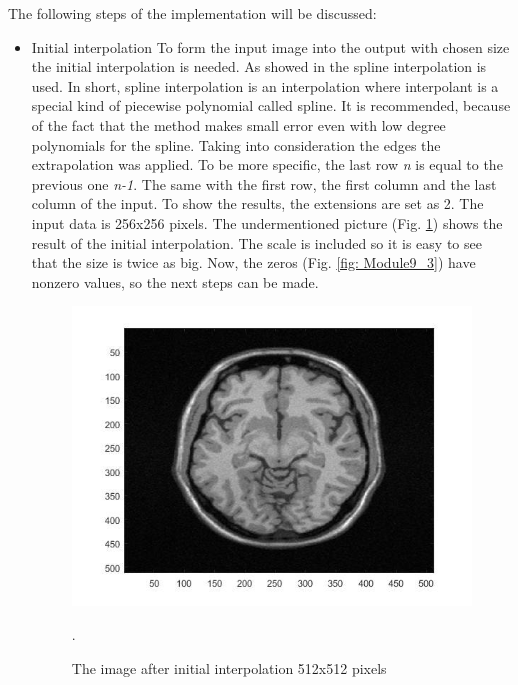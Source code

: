 \begin{enumerate}
The following steps of the implementation will be discussed:

\begin{itemize}
\item Initial interpolation
\newline To form the input image into the output with chosen size the initial interpolation is needed. As showed in \cite{9art1} the spline interpolation is used. In short, spline interpolation is an interpolation where interpolant is a special kind of piecewise polynomial called spline. It is recommended, because of the fact that the method makes small error even with low degree polynomials for the spline. Taking into consideration the edges the extrapolation was applied. To be more specific, the last row \textit{n} is equal to the previous one \textit{n-1}. The same with the first row, the first column and the last column of the input. To show the results, the extensions are set as 2. The input data is 256x256 pixels. The undermentioned picture (Fig. \ref{fig: Module10_5}) shows the result of the initial interpolation. The scale is included so it is easy to see that the size is twice as big. Now, the zeros (Fig. \ref{fig: Module9_3}) have  nonzero values, so the next steps can be made.


\begin{figure}[H]
\centering{}\includegraphics[scale=0.5]{figures/Module_10/Module10_5}\caption{The image after initial interpolation 512x512 pixels}. 
\label{fig: Module10_5}
\end{figure}


\end{itemize}
\end{enumerate}
